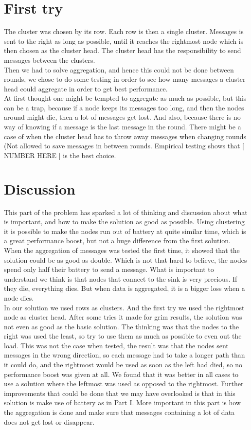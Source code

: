 \documentclass{article}
\begin{document}
  \section{First try}
   The cluster was chosen by its row. Each row is then a single cluster. Messages
   is sent to the right as long as possible, until it reaches the rightmost
   node which is then chosen as the cluster head. The cluster head has the
   responsibility to send messages between the clusters.\\
   Then we had to solve aggregation, and hence this could not be done between
   rounds, we chose to do some testing in order to see how many messages a cluster
   head could aggregate in order to get best performance.\\
   At first thought one might be tempted to aggregate as much as possible, but
   this can be a trap, because if a node keeps its messages too long, and then
   the nodes around might die, then a lot of messages get lost. And also, because
   there is no way of knowing if a message is the last message in the round. There might be
   a case of when the cluster head has to throw away messages when changing
   rounds (Not allowed to save messages in between rounds. Empirical testing
   shows that [ NUMBER HERE ] is the best choice.
     
  \section{Discussion}
 This part of the problem has sparked a lot of thinking and discussion about what
 is important, and how to make the solution as good as possible. Using clustering
 it is possible to make the nodes run out of battery at quite similar time, which
 is a great performance boost, but not a huge difference from the first solution.
 When the aggregation of messages was tested the first time, it showed that the
 solution could be as good as double. Which is not that hard to believe, the nodes
 spend only half their battery to send a message. What is important to understand
 we think is that nodes that connect to the sink is very precious. If they die,
 everything dies. But when data is aggregated, it is a bigger loss when a node
 dies.\\
 In our solution we used rows as clusters. And the first try we used the rightmost
 node as cluster head. After some tries it made for grim results, the solution
 was not even as good as the basic solution. The thinking was that the nodes
 to the right was used the least, so try to use them as much as possible to
 even out the load. This was not the case when tested, the result was that
 the nodes sent messages in the wrong direction, so each message had to take a
 longer path than it could do, and the rightmost would be used as soon as the
 left had died, so no performance boost was given at all. We found that it
 was better in all cases to use a solution where the leftmost
 was used as opposed to the rightmost. Further improvements that could be done
 that we may have overlooked is that in this solution is make use of battery
 as in Part I. More important in this part is how the aggregation is done
 and make sure that messages containing a lot of data does not get lost or
 disappear.
  
\end{document}
